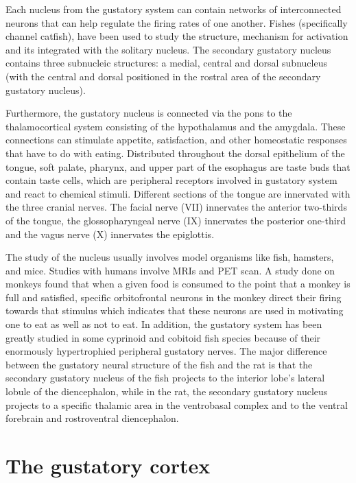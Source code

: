 \documentclass[]{book}
\begin{document}
Each nucleus from the gustatory system can contain networks of interconnected neurons that can help regulate the firing rates of one another. Fishes (specifically channel catfish), have been used to study the structure, mechanism for activation and its integrated with the solitary nucleus. The secondary gustatory nucleus contains three subnucleic structures: a medial, central and dorsal subnucleus (with the central and dorsal positioned in the rostral area of the secondary gustatory nucleus).

Furthermore, the gustatory nucleus is connected via the pons to the thalamocortical system consisting of the hypothalamus and the amygdala. These connections can stimulate appetite, satisfaction, and other homeostatic responses that have to do with eating. Distributed throughout the dorsal epithelium of the tongue, soft palate, pharynx, and upper part of the esophagus are taste buds that contain taste cells, which are peripheral receptors involved in gustatory system and react to chemical stimuli. Different sections of the tongue are innervated with the three cranial nerves. The facial nerve (VII) innervates the anterior two-thirds of the tongue, the glossopharyngeal nerve (IX) innervates the posterior one-third and the vagus nerve (X) innervates the epiglottis.

The study of the nucleus usually involves model organisms like fish, hamsters, and mice. Studies with humans involve MRIs and PET scan. A study done on monkeys found that when a given food is consumed to the point that a monkey is full and satisfied, specific orbitofrontal neurons in the monkey direct their firing towards that stimulus which indicates that these neurons are used in motivating one to eat as well as not to eat. In addition, the gustatory system has been greatly studied in some cyprinoid and cobitoid fish species because of their enormously hypertrophied peripheral gustatory nerves. The major difference between the gustatory neural structure of the fish and the rat is that the secondary gustatory nucleus of the fish projects to the interior lobe's lateral lobule of the diencephalon, while in the rat, the secondary gustatory nucleus projects to a specific thalamic area in the ventrobasal complex and to the ventral forebrain and rostroventral diencephalon.

\hypertarget{the-gustatory-cortex}{%
\section{The gustatory cortex}\label{the-gustatory-cortex}}
\end{document}
